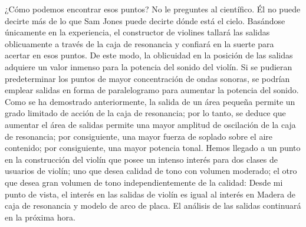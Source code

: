 ¿Cómo podemos encontrar esos puntos? No le preguntes al científico.
Él no puede decirte más de lo que Sam Jones puede decirte dónde está el cielo.
Basándose únicamente en la experiencia, el constructor de violines tallará las salidas oblicuamente a través de la caja de resonancia y confiará en la suerte para acertar en esos puntos. De este modo, la oblicuidad en la posición de las salidas adquiere un valor inmenso para la potencia del sonido del violín. Si se pudieran predeterminar los puntos de mayor concentración de ondas sonoras, se podrían emplear salidas en forma de paralelogramo para aumentar la potencia del sonido.
Como se ha demostrado anteriormente, la salida de un área pequeña permite un grado limitado de acción de la caja de resonancia; por lo tanto, se deduce que aumentar el área de salidas permite una mayor amplitud de oscilación de la caja de resonancia; por consiguiente, una mayor fuerza de soplado sobre el aire contenido; por consiguiente, una mayor potencia tonal.
Hemos llegado a un punto en la construcción del violín que posee un intenso interés para dos clases de usuarios de violín; uno que desea calidad de tono con volumen moderado; el otro que desea gran volumen de tono independientemente de la calidad: Desde mi punto de vista, el interés en las salidas de violín es igual al interés en
Madera de caja de resonancia y modelo de arco de placa. El análisis de las salidas continuará en la próxima hora.
